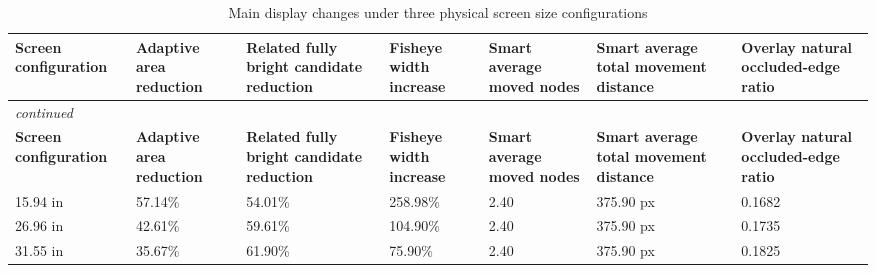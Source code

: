 \begin{center}

\begin{longtable}{@{}p{} p{} p{} p{} p{} p{} p{}@{}}
\caption{Main display changes under three physical screen size configurations}\label{tab:screen-size-results}\\
\toprule
\textbf{Screen configuration} & \textbf{Adaptive area reduction} & \textbf{Related fully bright candidate reduction} & \textbf{Fisheye width increase} & \textbf{Smart average moved nodes} & \textbf{Smart average total movement distance} & \textbf{Overlay natural occluded-edge ratio} \\
\midrule
\endfirsthead
\multicolumn{7}{l}{\itshape continued}\\
\toprule
\textbf{Screen configuration} & \textbf{Adaptive area reduction} & \textbf{Related fully bright candidate reduction} & \textbf{Fisheye width increase} & \textbf{Smart average moved nodes} & \textbf{Smart average total movement distance} & \textbf{Overlay natural occluded-edge ratio} \\
\midrule
\endhead
15.94 in & 57.14\% & 54.01\% & 258.98\% & 2.40 & 375.90 px & 0.1682 \\
26.96 in & 42.61\% & 59.61\% & 104.90\% & 2.40 & 375.90 px & 0.1735 \\
31.55 in & 35.67\% & 61.90\% & 75.90\% & 2.40 & 375.90 px & 0.1825 \\
\bottomrule
\end{longtable}


\end{center}
